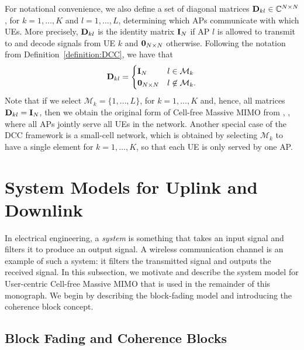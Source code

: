 For notational convenience, we also define a set of diagonal matrices $\mathbf{D}_{kl} \in \mathbb{C}^{N \times N}$, for $k=1,\ldots,K$ and $l=1,\ldots,L$, determining which APs communicate with which UEs. More precisely, $\mathbf{D}_{kl}$ is the identity matrix ${\bf I}_N$ if AP $l$ is allowed to transmit to and decode signals from UE $k$ and ${\bf 0}_{N\times N}$ otherwise. Following the notation from Definition~\ref{definition:DCC}, we have that
\begin{equation}\label{eq:user-centric}
\mathbf{D}_{kl}= \begin{cases}
\mathbf{I}_N &  l \in \mathcal{M}_k \\ 
\mathbf{0}_{N \times N} &  l \not \in \mathcal{M}_k. \end{cases}
\end{equation}
Note that if we select $\mathcal{M}_k=\{ 1, \ldots, L\}$, for $k=1,\ldots,K$ and, hence, all matrices $\mathbf{D}_{kl}=\mathbf{I}_N$, then we obtain the original form of Cell-free Massive \gls{MIMO} from \cite{Nayebi2017a}, \cite{Ngo2017b}, where all \glspl{AP} jointly serve all \glspl{UE} in the network.
Another special case of the \gls{DCC} framework is a small-cell network, which is obtained by selecting $\mathcal{M}_k$ to have a single element for $k=1,\ldots,K$, so that each \gls{UE} is only served by one \gls{AP}.



\section{System Models for Uplink and Downlink}\label{sec:signal-model-UL-and_DL}

In electrical engineering, a \emph{system} is something that takes an input signal and filters it to produce an output signal. A wireless communication channel is an example of such a system: it filters the transmitted signal and outputs the received signal. In this subsection, we motivate and describe the system model for User-centric Cell-free Massive MIMO that is used in the remainder of this monograph. We begin by describing the block-fading model and introducing the coherence block concept.

\subsection{Block Fading and Coherence Blocks}\label{sec:block-fading}

